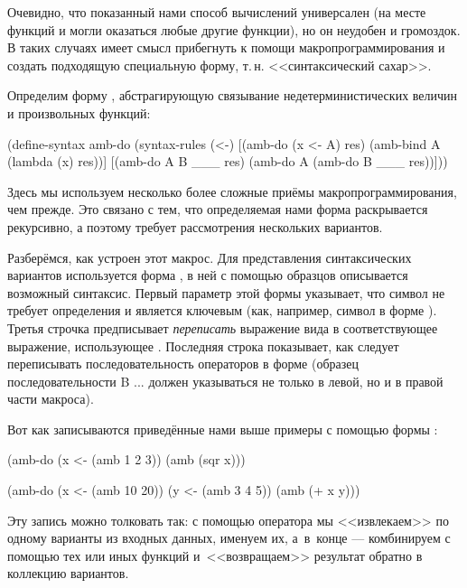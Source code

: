 Очевидно, что показанный нами способ вычислений универсален (на месте функций   и \s{+} могли оказаться любые другие функции), но он неудобен и громоздок. В таких случаях имеет смысл прибегнуть к помощи макропрограммирования и создать подходящую специальную форму, т.\,н. <<синтаксический сахар>>.

Определим форму , абстрагирующую связывание недетерминистических величин и произвольных функций:

\begin{Definition}[emph={x,A,res,B}]
(define-syntax amb-do
  (syntax-rules (<-) 
    [(amb-do (x <- A) res) (amb-bind A (lambda (x) res))]
    [(amb-do A B ___ res)  (amb-do A (amb-do B ___ res))]))
\end{Definition}

Здесь мы используем несколько более сложные приёмы макропрограммирования, чем прежде. Это связано с тем, что определяемая нами форма раскрывается рекурсивно, а поэтому требует рассмотрения нескольких вариантов. 

Разберёмся, как устроен этот макрос. Для представления синтаксических вариантов используется форма , в ней с помощью образцов описывается возможный синтаксис. Первый параметр этой формы \s{(<-)} указывает, что символ \s{<-} не требует определения и является ключевым (как, например, символ  в форме ).
Третья строчка предписывает \emph{переписать} выражение вида  в соответствующее выражение, использующее . Последняя строка показывает, как следует переписывать последовательность операторов в форме  (образец последовательности {\schemestyle B ...} должен указываться не только в левой, но и в правой части макроса).

Вот как записываются приведённые нами выше примеры с помощью формы :

\begin{SchemeCode}
(amb-do  (x <- (amb 1 2 3))  (amb (sqr x)))
\end{SchemeCode}

\begin{SchemeCode}
(amb-do 
  (x <- (amb 10 20))
  (y <- (amb 3 4 5)) 
  (amb (+ x y)))
\end{SchemeCode}

Эту запись можно толковать так: с помощью оператора \s{<-} мы <<извлекаем>> по одному варианты из входных данных, именуем их, а~в~конце --- комбинируем с помощью тех или иных функций и~<<возвращаем>> результат обратно в коллекцию вариантов.

